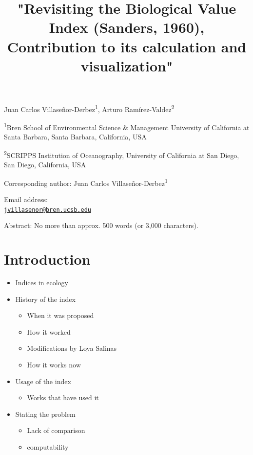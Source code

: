 \documentclass[12pt,]{article}
\title{\Large{"Revisiting the Biological Value Index (Sanders, 1960), Contribution to its calculation and visualization"}}
\author{}
\date{}
\providecommand{\tightlist}{%
  \setlength{\itemsep}{0pt}\setlength{\parskip}{0pt}}
\begin{document}
\maketitle

Juan Carlos Villaseñor-Derbez\textsuperscript{1}, Arturo
Ramírez-Valdez\textsuperscript{2}

\textsuperscript{1}Bren School of Environmental Science \& Management
University of California at Santa Barbara, Santa Barbara, California,
USA

\textsuperscript{2}SCRIPPS Institution of Oceanography, University of
California at San Diego, San Diego, California, USA

Corresponding author: Juan Carlos Villaseñor-Derbez\textsuperscript{1}

Email address:\\
\href{mailto:jvillasenor@bren.ucsb.edu}{\nolinkurl{jvillasenor@bren.ucsb.edu}}

\clearpage

Abstract: No more than approx. 500 words (or 3,000 characters).

\section{Introduction}\label{introduction}

\begin{itemize}
\item
  Indices in ecology
\item
  History of the index

  \begin{itemize}
  \tightlist
  \item
    When it was proposed
  \item
    How it worked
  \item
    Modifications by Loya Salinas
  \item
    How it works now
  \end{itemize}
\item
  Usage of the index

  \begin{itemize}
  \tightlist
  \item
    Works that have used it
  \end{itemize}
\item
  Stating the problem

  \begin{itemize}
  \tightlist
  \item
    Lack of comparison
  \item
    computability
  \end{itemize}
\end{itemize}
\end{document}
